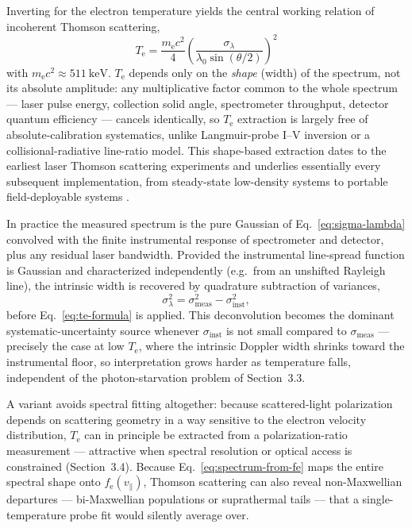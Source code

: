 Inverting for the electron temperature yields the central working relation of incoherent Thomson scattering,
\begin{equation}
\boxed{\;T_{\mathrm{e}} = \frac{m_{\mathrm{e}} c^{2}}{4}\left(\frac{\sigma_{\lambda}}{\lambda_{0}\sin(\theta/2)}\right)^{2}\;}
\label{eq:te-formula}
\end{equation}
with $m_{\mathrm{e}}c^{2}\approx\SI{511}{\kilo\electronvolt}$. $T_{\mathrm{e}}$ depends only on the \emph{shape} (width) of the spectrum, not its absolute amplitude: any multiplicative factor common to the whole spectrum — laser pulse energy, collection solid angle, spectrometer throughput, detector quantum efficiency — cancels identically, so $T_{\mathrm{e}}$ extraction is largely free of absolute-calibration systematics, unlike Langmuir-probe I--V inversion or a collisional-radiative line-ratio model. This shape-based extraction dates to the earliest laser Thomson scattering experiments \cite{ref0384} and underlies essentially every subsequent implementation, from steady-state low-density systems \cite{ref0383} to portable field-deployable systems \cite{ref0357}.

In practice the measured spectrum is the pure Gaussian of Eq.~\eqref{eq:sigma-lambda} convolved with the finite instrumental response of spectrometer and detector, plus any residual laser bandwidth. Provided the instrumental line-spread function is Gaussian and characterized independently (e.g.\ from an unshifted Rayleigh line), the intrinsic width is recovered by quadrature subtraction of variances,
\begin{equation}
\sigma_{\lambda}^{2} = \sigma_{\mathrm{meas}}^{2} - \sigma_{\mathrm{inst}}^{2},
\label{eq:deconvolution}
\end{equation}
before Eq.~\eqref{eq:te-formula} is applied. This deconvolution becomes the dominant systematic-uncertainty source whenever $\sigma_{\mathrm{inst}}$ is not small compared to $\sigma_{\mathrm{meas}}$ — precisely the case at low $T_{\mathrm{e}}$, where the intrinsic Doppler width shrinks toward the instrumental floor, so interpretation grows harder as temperature falls, independent of the photon-starvation problem of Section~3.3.

A variant avoids spectral fitting altogether: because scattered-light polarization depends on scattering geometry in a way sensitive to the electron velocity distribution, $T_{\mathrm{e}}$ can in principle be extracted from a polarization-ratio measurement — attractive when spectral resolution or optical access is constrained (Section~3.4). Because Eq.~\eqref{eq:spectrum-from-fe} maps the entire spectral shape onto $f_{\mathrm{e}}(v_{\parallel})$, Thomson scattering can also reveal non-Maxwellian departures — bi-Maxwellian populations or suprathermal tails — that a single-temperature probe fit would silently average over.

